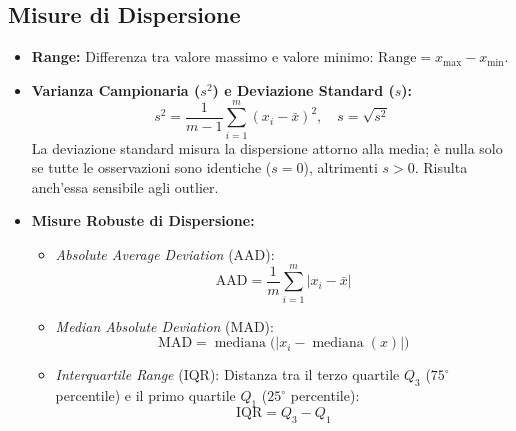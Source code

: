 \subsection{Misure di Dispersione}
\begin{itemize}
    \item \textbf{Range:} Differenza tra valore massimo e valore minimo: $\text{Range} = x_{\max} - x_{\min}$.
    \item \textbf{Varianza Campionaria ($s^2$) e Deviazione Standard ($s$):}
    \begin{equation}
    s^2 = \frac{1}{m-1} \sum_{i=1}^m (x_i - \bar{x})^2, \quad s = \sqrt{s^2}
    \end{equation}
    La deviazione standard misura la dispersione attorno alla media; è nulla solo se tutte le osservazioni sono identiche ($s=0$), altrimenti $s > 0$. Risulta anch'essa sensibile agli outlier.
    \item \textbf{Misure Robuste di Dispersione:}
    \begin{itemize}
        \item \textit{Absolute Average Deviation} (AAD):
        \begin{equation}
        \text{AAD} = \frac{1}{m} \sum_{i=1}^m |x_i - \bar{x}|
        \end{equation}
        \item \textit{Median Absolute Deviation} (MAD):
        \begin{equation}
        \text{MAD} = \operatorname{mediana}\big(|x_i - \operatorname{mediana}(x)|\big)
        \end{equation}
        \item \textit{Interquartile Range} (IQR): Distanza tra il terzo quartile $Q_3$ ($75^\circ$ percentile) e il primo quartile $Q_1$ ($25^\circ$ percentile):
        \begin{equation}
        \text{IQR} = Q_3 - Q_1
        \end{equation}
    \end{itemize}
\end{itemize}

